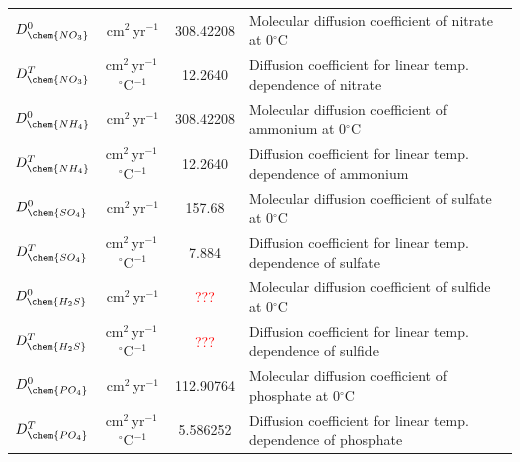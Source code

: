 \documentclass[gmd, manuscript]{copernicus}
\begin{document}
\begin{table}[hbtp]
\begin{tabular}{l c c l}
$D_{\chem{NO_3}}^0$ & cm$^2$\,yr$^{-1}$ & 308.42208 &Molecular diffusion coefficient of nitrate at 0$^\circ$C\\
$D_{\chem{NO_3}}^T$ & cm$^2$\,yr$^{-1}$\,${}^{\circ}$C$^{-1}$ & 12.2640 &Diffusion coefficient for linear temp. dependence of nitrate\\ %
$D_{\chem{NH_4}}^0$ & cm$^2$\,yr$^{-1}$ & 308.42208 &Molecular diffusion coefficient of ammonium at 0$^\circ$C\\
$D_{\chem{NH_4}}^T$ & cm$^2$\,yr$^{-1}$\,${}^{\circ}$C$^{-1}$ & 12.2640 &Diffusion coefficient for linear temp. dependence of ammonium\\ %
$D_{\chem{SO_4}}^0$ & cm$^2$\,yr$^{-1}$ & 157.68 &Molecular diffusion coefficient of sulfate at 0$^\circ$C\\
$D_{\chem{SO_4}}^T$ & cm$^2$\,yr$^{-1}$\,${}^{\circ}$C$^{-1}$ & 7.884 &Diffusion coefficient for linear temp. dependence of sulfate\\ %
$D_{\chem{H_2S}}^0$ & cm$^2$\,yr$^{-1}$ & \textcolor{red}{???} &Molecular diffusion coefficient of sulfide at 0$^\circ$C\\
$D_{\chem{H_2S}}^T$ & cm$^2$\,yr$^{-1}$\,${}^{\circ}$C$^{-1}$ & \textcolor{red}{???} &Diffusion coefficient for linear temp. dependence of sulfide\\ %
$D_{\chem{PO_4}}^0$ & cm$^2$\,yr$^{-1}$ & 112.90764 &Molecular diffusion coefficient of phosphate at 0$^\circ$C\\
$D_{\chem{PO_4}}^T$ & cm$^2$\,yr$^{-1}$\,${}^{\circ}$C$^{-1}$ & 5.586252 &Diffusion coefficient for linear temp. dependence of phosphate\\ %
\hline\hline
\end{tabular}
\label{table:sed-charac_transport-parameters}
\end{table}
\end{document}
